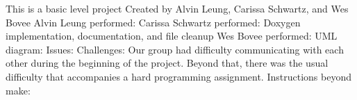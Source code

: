 This is a basic level project Created by Alvin Leung, Carissa Schwartz, and Wes Bovee Alvin Leung performed\+: Carissa Schwartz performed\+: Doxygen implementation, documentation, and file cleanup Wes Bovee performed\+: U\+ML diagram\+: Issues\+: Challenges\+: Our group had difficulty communicating with each other during the beginning of the project. Beyond that, there was the usual difficulty that accompanies a hard programming assignment. Instructions beyond \textquotesingle{}make\textquotesingle{}\+: 
